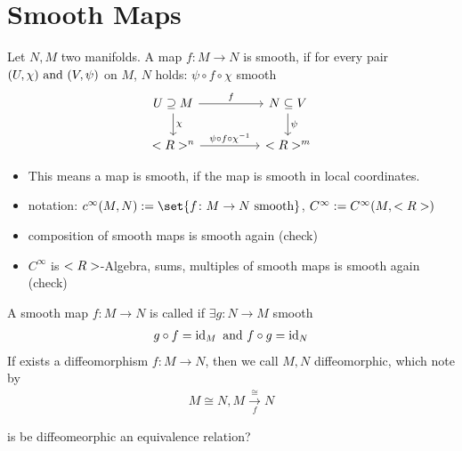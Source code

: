 \section{Smooth Maps}
\begin{definition}
	Let $N,M$ two manifolds. A map $f\colon M \to N$ is smooth, if for every pair $(U,\chi) \text{ and } (V,\psi)$ on $M$, $N$ holds: $\psi \circ f \circ \chi$ smooth
	\[
		\begin{tikzcd}
			U \supseteq M \arrow[rr, "f"] \arrow[d, "\chi"] &  & N \subseteq V \arrow[d, "\psi"] \\
			\R^n \arrow[rr, "\psi \circ f \circ \chi^{-1}"] &  & \R^m                           
		\end{tikzcd}	
	\]
\end{definition}
\begin{*remark}
	\begin{itemize}
		\item This means a map is smooth, if the map is smooth in local coordinates.
		\item notation: $c^{\infty}(M,N) := \set{f\colon M \to N \text{ smooth}}$, $C^{\infty} := C^{\infty}(M, <R>)$
		\item composition of smooth maps is smooth again (check)
		\item $C^{\infty}$ is $<R>$-Algebra, sums, multiples of smooth maps is smooth again (check)
	\end{itemize}
\end{*remark}
\begin{definition}
	A smooth map $f\colon M \to N$ is called  if $\exists g \colon N \to M$ smooth
	\begin{align*}
		g \circ f = \operatorname{id}_M \text{ and } f \circ g = \operatorname{id}_N
	\end{align*}
	If exists a diffeomorphism $f \colon M \to N$, then we call $M,N$ diffeomorphic, which note by
	\begin{align*}
		M \cong N, M \xrightarrow[f]{\cong} N
	\end{align*}
\end{definition}
\begin{*remark}
	is be diffeomeorphic an equivalence relation?
\end{*remark}
